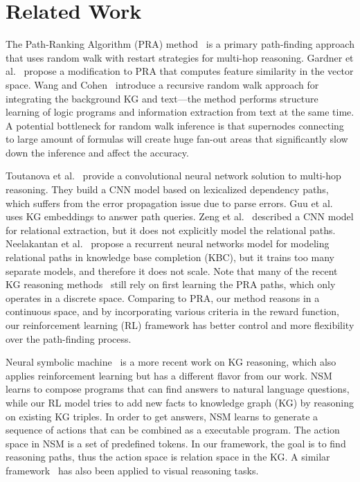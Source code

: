 \documentclass[11pt,letterpaper]{article}
\begin{document}
\section{Related Work}
The Path-Ranking Algorithm (PRA) method~\cite{DBLP:conf/emnlp/LaoMC11} is a primary path-finding approach that uses random walk with restart strategies for multi-hop reasoning. Gardner et al.~ propose a modification to PRA that computes feature similarity in the vector space. Wang and Cohen~ introduce a recursive random walk approach for integrating the background KG and text---the method performs structure learning of logic programs and information extraction from text at the same time. A potential bottleneck for random walk inference is that supernodes connecting to large amount of formulas will create huge fan-out areas that significantly slow down the inference and affect the accuracy. 

Toutanova et al.~ provide a convolutional neural network solution to multi-hop reasoning. They build a CNN model based on lexicalized dependency paths, which suffers from the error propagation issue due to parse errors. Guu et al.~ uses KG embeddings to answer path queries. Zeng et al.~ described a CNN model for relational extraction, but it does not explicitly model the relational paths. Neelakantan et al.~ propose a recurrent neural networks model for modeling relational paths in knowledge base completion (KBC), but it trains too many separate models, and therefore it does not scale. Note that many of the recent KG reasoning methods~\cite{neelakantan2015compositional,das2016chains} still rely on first learning the PRA paths, which only operates in a discrete space. Comparing to PRA, our method reasons in a continuous space, and by incorporating various criteria in the reward function, our reinforcement learning (RL) framework has better control and more flexibility over the path-finding process. 

Neural symbolic machine~\cite{liang2016neural} is a more recent work on KG reasoning, which also applies reinforcement learning but has a different flavor from our work. NSM learns to compose programs that can find answers to natural language questions, while our RL model tries to add new facts to knowledge graph (KG) by reasoning on existing KG triples. In order to get answers, NSM learns to generate a sequence of actions that can be combined as a executable program. The action space in NSM is a set of predefined tokens. In our framework, the goal is to find reasoning paths, thus the action space is relation space in the KG. A similar framework~\cite{johnson2017inferring} has also been applied to visual reasoning tasks.
\end{document}
